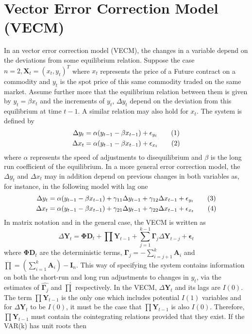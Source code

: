 \documentclass[11pt,a4,twosided,singlespacing,titlepagenumber=on]{scrreprt}
\numberwithin{equation}{chapter} %
\theoremstyle{remark}
\newcommand{\matr}[1]{\mathbf{#1}}
\newcommand\numberthis{\addtocounter{equation}{1}\tag{\theequation}}
\begin{document}
\section{Vector Error Correction Model (VECM)}
In an vector error correction model (VECM), the changes in a variable depend on the deviations from some equilibrium relation. Suppose the case $n=2, \matr{X}_t = (x_t, y_t)^T$ where $x_t$ represents the price of a Future contract on a commodity and $y_t$ is the spot price of this same commodity traded on the same market. Assume further more that the equilibrium relation between them is given by $y_t = \beta x_t$ and the increments of $y_t$, $\Delta y_t$ depend on the deviation from this equilibrium at time $t-1$. A similar relation may also hold for $x_t$. The system is defined by
\begin{align*}
\Delta y_t &= \alpha (y_{t-1} - \beta x_{t-1}) + \epsilon_{y_t} \numberthis \\
\Delta x_t &= \alpha (y_{t-1} - \beta x_{t-1}) + \epsilon_{x_t} \numberthis
\end{align*}
where $\alpha$ represents the speed of adjustments to disequilibrium and $\beta$ is the long run coefficient of the equilibrium. In a more general error correction model, the $\Delta y_t$ and $\Delta x_t$ may in addition depend on previous changes in both variables as, for instance, in the following model with lag one
\begin{align*}
\Delta y_t &= \alpha (y_{t-1} - \beta x_{t-1}) + \gamma_{11} \Delta y_{t-1} + \gamma_{12} \Delta x_{t-1} + \epsilon_{y_t} \numberthis \\
\Delta x_t &= \alpha (y_{t-1} - \beta x_{t-1}) + \gamma_{21} \Delta y_{t-1} + \gamma_{22} \Delta x_{t-1} + \epsilon_{x_t} \numberthis
\end{align*}
In matrix notation and in the general case, the VECM is written as
\begin{equation}
\Delta \matr{Y}_t = \matr{\Phi} \matr{D}_t + \prod \matr{Y}_{t-1} + \sum_{j=1}^{k-1} \matr{\Gamma}_j \Delta \matr{Y}_{t-j} + \matr{\epsilon}_t
\end{equation}
where $\matr{\Phi} \matr{D}_t$ are the deterministic terms, $\matr{\Gamma}_j = - \sum_{i=j+1}^k \matr{A}_i$ and $\prod = \left(\sum_{i=1}^k \matr{A}_i \right) - \matr{I}_n$. This way of specifying the system contains information on both the short-run and long run adjustments to changes in $y_t$, via the estimates of $\hat{\matr{\Gamma}_j}$ and $\hat{\prod}$ respectively. In the VECM, $\Delta \matr{Y}_t$ and its lags are $I(0)$. The term $\prod \matr{Y}_{t-1}$ is the only one which includes potential $I(1)$ variables and for $\Delta \matr{Y}_t$ to be $I(0)$, it must be the case that $\prod \matr{Y}_{t-1}$ is also $I(0)$. Therefore, $\prod \matr{Y}_{t-1}$ must contain the cointegrating relations provided that they exist. If the VAR(k) has unit roots then 
\end{document}
